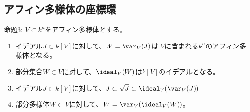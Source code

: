 \subsection{アフィン多様体の座標環}
\label{sub:アフィン多様体の座標環}

\begin{framed}
命題3:
$V\subset k^n$をアフィン多様体とする。
\begin{enumerate}[label=(\roman*)]
  \item イデアル$J\subset k[V]$に対して、$W=\var_V(J)$は
  $V$に含まれる$k^n$のアフィン多様体となる。
  \item
  部分集合$W\subset V$に対して、$\ideal_V(W)$は$k[V]$のイデアルとなる。
  \item
  イデアル$J\subset k[V]$に対して、$J\subset \sqrt{J} \subset \ideal_V(\var_V(J))$
  \item
  部分多様体$W\subset V$に対して、$W=\var_V(\ideal_V(W))$。
\end{enumerate}
\end{framed}
